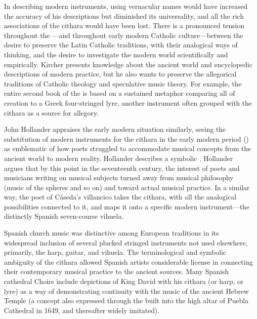 In describing modern instruments, using vernacular names would have increased
the accuracy of his descriptions but diminished its universality, and all the
rich associations of the cithara would have been lost.
There is a pronounced tension throughout the ---and throughout
early modern Catholic culture---between the desire to preserve the Latin
Catholic traditions, with their analogical ways of thinking, and the desire to
investigate the modern world scientifically and empirically.
Kircher presents  knowledge about the ancient world and
encyclopedic descriptions of modern practice, but he also wants to preserve the
allegorical traditions of Catholic theology and speculative music theory.
For example, the entire second book of the  is based on a
sustained metaphor comparing all of creation to a Greek four-stringed lyre,
another instrument often grouped with the cithara as a source for allegory.

John Hollander appraises the early modern situation similarly, seeing the
substitution of modern instruments for the cithara in the early modern period
() as emblematic of how poets struggled to accommodate
musical concepts from the ancient world to modern reality.
Hollander describes a symbolic .%
    \Autocite[44--51]{Hollander:Untuning}
Hollander argues that by this point in the seventeenth century, the interest of
poets and musicians writing on musical subjects turned away from musical
philosophy (music of the spheres and so on) and toward actual musical practice. 
In a similar way, the poet of Cáseda's villancico takes the cithara, with all
the analogical possibilities connected to it, and maps it onto a specific
modern instrument---the distinctly Spanish seven-course vihuela.

Spanish church music was distinctive among European traditions in its
widespread inclusion of several plucked stringed instruments not used
elsewhere, primarily, the harp, guitar, and vihuela. 
The terminological and symbolic ambiguity of the cithara allowed Spanish
artists considerable license in connecting their contemporary musical practice
to the ancient sources.
Many Spanish cathedral Choirs include depictions of King David with his cithara
(or harp, or lyre) as a way of demonstrating continuity with the music of the
ancient Hebrew Temple (a concept also expressed through the  built into the high altar of Puebla Cathedral in 1649, and thereafter
widely imitated). 

